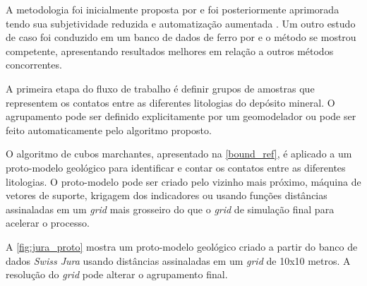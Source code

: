 A metodologia foi inicialmente proposta por  e foi posteriormente aprimorada tendo sua subjetividade reduzida e automatização aumentada \cite{amarante2021boundary}. Um outro estudo de caso foi conduzido em um banco de dados de ferro por  e o método se mostrou competente, apresentando resultados melhores em relação a outros métodos concorrentes.

A primeira etapa do fluxo de trabalho é definir grupos de amostras que representem os contatos entre as diferentes litologias do depósito mineral. O agrupamento pode ser definido explicitamente por um geomodelador ou pode ser feito automaticamente pelo algoritmo proposto.

O algoritmo de cubos marchantes, apresentado na \autoref{bound_ref}, é aplicado a um proto-modelo geológico para identificar e contar os contatos entre as diferentes litologias. O proto-modelo pode ser criado pelo vizinho mais próximo, máquina de vetores de suporte, krigagem dos indicadores ou usando funções distâncias assinaladas em um \textit{grid} mais grosseiro do que o \textit{grid} de simulação final para acelerar o processo.

A \autoref{fig:jura_proto} mostra um proto-modelo geológico criado a partir do banco de dados \textit{Swiss Jura} usando distâncias assinaladas em um \textit{grid} de 10x10 metros. A resolução do \textit{grid} pode alterar o agrupamento final.

